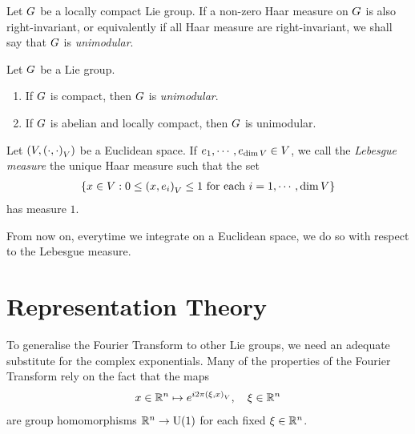 \begin{definition}
\label{definition:unimodular_group}
    Let $G$ be a locally compact Lie group.
    If a non-zero Haar measure on $G$ is also right-invariant,
    or equivalently if all Haar measure are right-invariant,
    we shall say that $G$ is \emph{unimodular}.
\end{definition}

\begin{proposition}
\label{proposition:sufficient_conditions_to_be_unimodular}
    Let $G$ be a Lie group.
    \begin{enumerate}
        \item If $G$ is compact, then $G$ is \emph{unimodular}.
        \item If $G$ is abelian and locally compact, then $G$ is unimodular.
    \end{enumerate}
\end{proposition}

\begin{definition}
\label{definition:Lebesgue_measure}
    Let $(V, {\left(\cdot, \cdot\right)_{V}})$ be a Euclidean space.
    If $e_1, \cdots, e_{\dim V} \in V$,
    we call the \emph{Lebesgue measure} the unique Haar measure such that the set
    \begin{align*}
        \{ x \in V : 0 \leq {\left(x, e_i\right)_{V}} \leq 1 \text{ for each } i = 1, \cdots, \dim V \}
    \end{align*}
    has measure $1$.
\end{definition}

From now on,
everytime we integrate on a Euclidean space,
we do so with respect to the Lebesgue measure.

\section{Representation Theory}

To generalise the Fourier Transform to other Lie groups,
we need an adequate substitute for the complex exponentials.
Many of the properties of the Fourier Transform rely on the fact that the maps
\begin{align*}
    x \in \mathbb{R}^n \mapsto e^{i 2 \pi {\left(\xi, x\right)_{V}}},
    \quad \xi \in \mathbb{R}^n
\end{align*}
are group homomorphisms $\mathbb{R}^n \to {\mathrm{U} (1)}$ for each fixed $\xi \in \mathbb{R}^n$.

